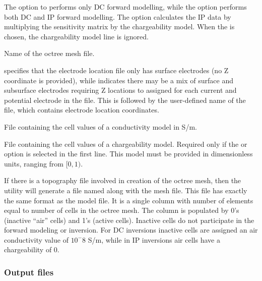 \begin{description}[leftmargin=5cm, style=sameline, align=left]
\item[\codeName{DC\textbar IP\textbar IPL}] The  option to performs only DC forward modelling, while the  option performs both DC and IP forward modelling. The  option calculates the IP data by multiplying the sensitivity matrix by the chargeability model. When the  is chosen, the chargeability model line is ignored.
\item[\fileName{octree mesh}] Name of the octree mesh file.
\item[\fileName{LOC\_XY(Z)}]  specifies that the electrode location file only has surface electrodes (no Z coordinate is provided), while  indicates there may be a mix of surface and subsurface electrodes requiring Z locations to assigned for each current and potential electrode in the file. This is followed by the user-defined name of the file, which contains electrode location coordinates.
\item[\fileName{conductivity model}] File containing the cell values of a conductivity model in S/m.
\item[\fileName{chargeability model}] File containing the cell values of a chargeability model. Required only if the  or  option is selected in the first line. This model must be provided in dimensionless units, ranging from $[0,1)$.
\item[\fileName{topography active cells}] If there is a topography file involved in creation of the octree mesh, then the utility  will generate a file named  along with the mesh file. This file has exactly the same format as the model file. It is a single column with number of elements equal to number of cells in the octree mesh. The column is populated by 0's (inactive ``air'' cells) and 1's (active cells). Inactive cells do not participate in the forward modeling or inversion. For DC inversions inactive cells are assigned an air conductivity value of $10^-8$ S/m, while in IP inversions air cells have a chargeability of 0.
\end{description} 

\subsubsection{Output files}    

